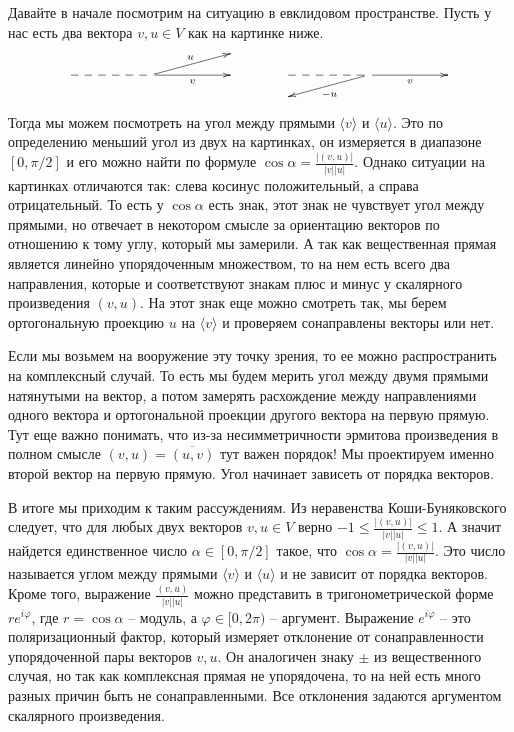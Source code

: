 Давайте в начале посмотрим на ситуацию в евклидовом пространстве.
Пусть у нас есть два вектора $v, u\in V$ как на картинке ниже.
\[
\xymatrix@R=10pt{
	{}&{}&{}&{}&{}\\
	{}&{}&{}\ar[rr]_v\ar@{--}[ll]\ar[rru]^u&{}&{}\\
	{}&{}&{}&{}&{}\\
}
\quad
\quad
\quad
\xymatrix@R=10pt{
	{}&{}&{}&{}&{}\\
	{}&{}&{}\ar[rr]_v\ar@{--}[ll]\ar[lld]^{-u}&{}&{}\\
	{}&{}&{}&{}&{}\\
}
\]
Тогда мы можем посмотреть на угол между прямыми $\langle v\rangle$ и $\langle u\rangle$.
Это по определению меньший угол из двух на картинках, он измеряется в диапазоне $[0, \pi / 2]$ и его можно найти по формуле $\cos\alpha = \frac{|(v, u)|}{|v| |u|}$.
Однако ситуации на картинках отличаются так: слева косинус положительный, а справа отрицательный.
То есть у $\cos\alpha$ есть знак, этот знак не чувствует угол между прямыми, но отвечает в некотором смысле за ориентацию векторов по отношению к тому углу, который мы замерили.
А так как вещественная прямая является линейно упорядоченным множеством, то на нем есть всего два направления, которые и соответствуют знакам плюс и минус у скалярного произведения $(v, u)$.
На этот знак еще можно смотреть так, мы берем ортогональную проекцию $u$ на $\langle v\rangle$ и проверяем сонаправлены векторы или нет.

Если мы возьмем на вооружение эту точку зрения, то ее можно распространить на комплексный случай.
То есть мы будем мерить угол между двумя прямыми натянутыми на вектор, а потом замерять расхождение между направлениями одного вектора и ортогональной проекции другого вектора на первую прямую.
Тут еще важно понимать, что из-за несимметричности эрмитова произведения в полном смысле $(v, u) = \overline{(u, v)}$ тут важен порядок!
Мы проектируем именно второй вектор на первую прямую.
Угол начинает зависеть от порядка векторов.

В итоге мы приходим к таким рассуждениям.
Из неравенства Коши-Буняковского следует, что для любых двух векторов $v,u\in V$ верно $-1\leqslant \frac{|(v,u)|}{|v| |u|}\leqslant 1$.
А значит найдется единственное число $\alpha\in [0,\pi/2]$ такое, что $\cos \alpha = \frac{|(v,u)|}{|v| |u|}$.
Это число называется углом между прямыми $\langle v\rangle$ и $\langle u \rangle$ и не зависит от порядка векторов.
Кроме того, выражение $\frac{(v, u)}{|v| |u|}$ можно представить в тригонометрической форме $r e^{i\varphi}$, где $r = \cos \alpha$ -- модуль, а $\varphi \in [0,2\pi)$ -- аргумент.
Выражение $e^{i\varphi}$ -- это поляризационный фактор, который измеряет отклонение от сонаправленности упорядоченной пары векторов $v, u$.
Он аналогичен знаку $\pm$ из вещественного случая, но так как комплексная прямая не упорядочена, то на ней есть много разных причин быть не сонаправленными.
Все отклонения задаются аргументом скалярного произведения.

